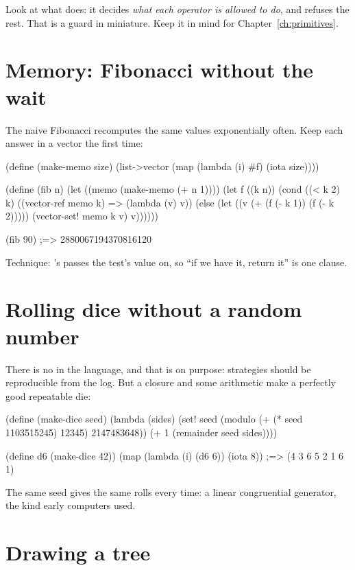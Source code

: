 Look at what  does: it decides \emph{what each operator is
allowed to do}, and refuses the rest. That is a guard in miniature. Keep it
in mind for Chapter~\ref{ch:primitives}.

\section{Memory: Fibonacci without the wait}

The naive Fibonacci recomputes the same values exponentially often. Keep
each answer in a vector the first time:

\begin{scm}
(define (make-memo size) (list->vector (map (lambda (i) #f) (iota size))))

(define (fib n)
  (let ((memo (make-memo (+ n 1))))
    (let f ((k n))
      (cond ((< k 2) k)
            ((vector-ref memo k) => (lambda (v) v))
            (else (let ((v (+ (f (- k 1)) (f (- k 2)))))
                    (vector-set! memo k v)
                    v))))))

(fib 90)                        ;=> 2880067194370816120
\end{scm}

Technique: 's \code{=>} passes the test's value on, so ``if we
have it, return it'' is one clause.

\section{Rolling dice without a random number}

There is no  in the language, and that is on purpose:
strategies should be reproducible from the log. But a closure and some
arithmetic make a perfectly good repeatable die:

\begin{scm}
(define (make-dice seed)
  (lambda (sides)
    (set! seed (modulo (+ (* seed 1103515245) 12345) 2147483648))
    (+ 1 (remainder seed sides))))

(define d6 (make-dice 42))
(map (lambda (i) (d6 6)) (iota 8))     ;=> (4 3 6 5 2 1 6 1)
\end{scm}

The same seed gives the same rolls every time: a linear congruential
generator, the kind early computers used.

\section{Drawing a tree}


